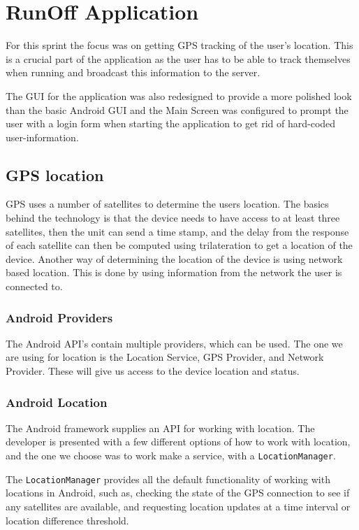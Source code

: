 \section{RunOff Application}
For this sprint the focus was on getting \ac{GPS} tracking of the user's location. This is a crucial part of the application as the user has to be able to track themselves when running and broadcast this information to the server.

The \ac{GUI} for the application was also redesigned to provide a more polished look than the basic Android \ac{GUI} and the Main Screen was configured to prompt the user with a login form when starting the application to get rid of hard-coded user-information.

\subsection{GPS location}
\ac{GPS} uses a number of satellites to determine the users location.
The basics behind the technology is that the device needs to have access to at least three satellites, then the unit can send a time stamp, and the delay from the response of each satellite can then be computed using trilateration to get a location of the device.
Another way of determining the location of the device is using network based location. This is done by using information from the network the user is connected to.

\subsubsection{Android Providers}
The Android \ac{API}'s contain multiple providers, which can be used. The one we are using for location is the Location Service, \ac{GPS} Provider, and Network Provider. These will give us access to the device location and status.

\subsubsection{Android Location}
The Android framework supplies an \ac{API} for working with location.
The developer is presented with a few different options of how to work with location, and the one we choose was to work make a service, with a \texttt{LocationManager}.

The \texttt{LocationManager} provides all the default functionality of working with locations in Android, such as, checking the state of the \ac{GPS} connection to see if any satellites are available, and requesting location updates at a time interval or location difference threshold.

